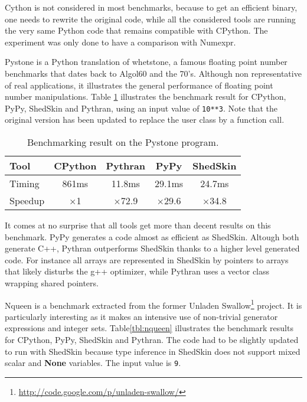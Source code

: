 \documentclass[10pt, onecolumn, preprint]{sigplanconf}
\begin{document}
Cython is not considered in most benchmarks, because to get an efficient
binary, one needs to rewrite the original code, while all the considered tools
are running the very same Python code that remains compatible with CPython. The
experiment was only done to have a comparison with Numexpr.

Pystone is a Python translation of whetstone, a famous floating point number
benchmarks that dates back to Algol60 and the 70's. Although non representative
of real applications, it illustrates the general performance of floating point
number manipulations. Table \ref{tbl:pystone}  illustrates the benchmark
result for CPython, PyPy, ShedSkin and Pythran, using an input value of
\texttt{10**3}. Note that the original version has been updated to replace the user
class by a function call.

\begin{table}
    \centering

    \begin{tabular}{|l|c|c|c|c|}
        \hline
     Tool    &  CPython    &   Pythran     &     PyPy   &  ShedSkin  \\
    \hline
     Timing  &  861ms      &   11.8ms      &     29.1ms &  24.7ms    \\
    \hline
     Speedup &  $\times$1         &   $\times$72.9       &    $\times$29.6   &  $\times$34.8     \\
    \hline
\end{tabular}

    \caption{Benchmarking result on the Pystone program.}
    \label{tbl:pystone}

\end{table}

It comes at no surprise that all tools get more than decent results on this
benchmark. PyPy generates a code almost as efficient as ShedSkin. Altough both
generate C++, Pythran outperforms ShedSkin thanks to a higher level generated
code. For instance all arrays are represented in ShedSkin by pointers to arrays
that likely disturbs the g++ optimizer, while Pythran uses a vector class wrapping
shared pointers.

Nqueen is a benchmark extracted from the former Unladen Swallow\footnote{\url{http://code.google.com/p/unladen-swallow/}} project. It
is particularly interesting as it makes an intensive use of non-trivial
generator expressions and integer sets. Table\ref{tbl:nqueen} illustrates
the benchmark results for CPython, PyPy, ShedSkin and Pythran. The code had to
be slightly updated to run with ShedSkin because type inference in ShedSkin does
not support mixed scalar and \textbf{None} variables. The input value is \texttt{9}.
\end{document}
